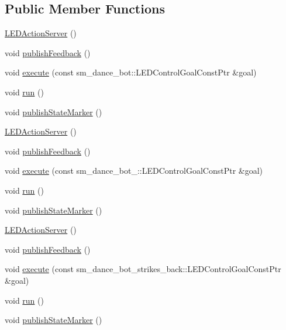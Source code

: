 \subsection*{Public Member Functions}
\begin{DoxyCompactItemize}
\item 
\hyperlink{classLEDActionServer_a6978c43940438b9fd8bfcd6b443092d3}{L\+E\+D\+Action\+Server} ()
\item 
void \hyperlink{classLEDActionServer_a25c93d4e7ecdacbb4f5b090d7789aa36}{publish\+Feedback} ()
\item 
void \hyperlink{classLEDActionServer_a2d8b9dfca1912e24170ef69a5edf5e9b}{execute} (const sm\+\_\+dance\+\_\+bot\+::\+L\+E\+D\+Control\+Goal\+Const\+Ptr \&goal)
\item 
void \hyperlink{classLEDActionServer_ae8e1b2d4bf0a85eec3ffd1c7d4f08490}{run} ()
\item 
void \hyperlink{classLEDActionServer_a73bb754ac2347c50660624ad92315895}{publish\+State\+Marker} ()
\item 
\hyperlink{classLEDActionServer_a6978c43940438b9fd8bfcd6b443092d3}{L\+E\+D\+Action\+Server} ()
\item 
void \hyperlink{classLEDActionServer_a25c93d4e7ecdacbb4f5b090d7789aa36}{publish\+Feedback} ()
\item 
void \hyperlink{classLEDActionServer_ae7cf81f53d16e3bdb5142df60b2017b3}{execute} (const sm\+\_\+dance\+\_\+bot\+\_\+::\+L\+E\+D\+Control\+Goal\+Const\+Ptr \&goal)
\item 
void \hyperlink{classLEDActionServer_ae8e1b2d4bf0a85eec3ffd1c7d4f08490}{run} ()
\item 
void \hyperlink{classLEDActionServer_a73bb754ac2347c50660624ad92315895}{publish\+State\+Marker} ()
\item 
\hyperlink{classLEDActionServer_a6978c43940438b9fd8bfcd6b443092d3}{L\+E\+D\+Action\+Server} ()
\item 
void \hyperlink{classLEDActionServer_a25c93d4e7ecdacbb4f5b090d7789aa36}{publish\+Feedback} ()
\item 
void \hyperlink{classLEDActionServer_aea69ee96367e9f6a82d6302f148505d6}{execute} (const sm\+\_\+dance\+\_\+bot\+\_\+strikes\+\_\+back\+::\+L\+E\+D\+Control\+Goal\+Const\+Ptr \&goal)
\item 
void \hyperlink{classLEDActionServer_ae8e1b2d4bf0a85eec3ffd1c7d4f08490}{run} ()
\item 
void \hyperlink{classLEDActionServer_a73bb754ac2347c50660624ad92315895}{publish\+State\+Marker} ()
\end{DoxyCompactItemize}
